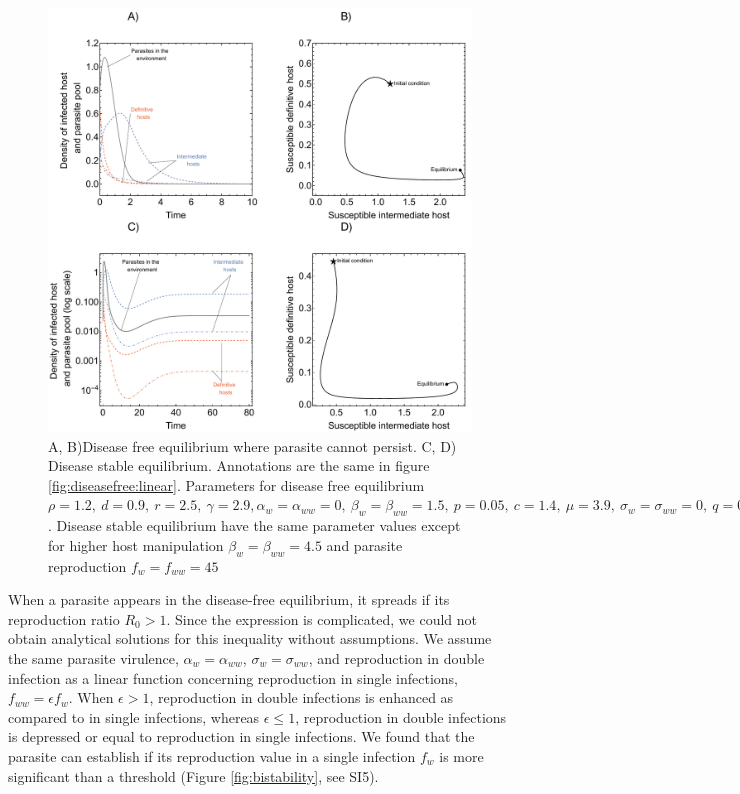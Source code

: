 \documentclass[a4paper]{scrartcl}
\begin{document}
\begin{figure}[!ht]
\includegraphics[width=\textwidth]{Figures/ecotraject_nonlinear.pdf}
\caption{A, B)Disease free equilibrium where parasite cannot persist. C, D) Disease stable equilibrium. Annotations are the same in figure \ref{fig:diseasefree:linear}. Parameters for disease free equilibrium $\rho =  1.2, \ d = 0.9, \  r = 2.5, \ \gamma =  2.9, \alpha_w = \alpha_{ww} =  0, \ \beta_w = \beta_{ww} = 1.5, \ p = 0.05, \  c = 1.4, \ \mu = 3.9, \ \sigma_w = \sigma_{ww} = 0, \ q = 0.05, \ f_w = f_{ww} = 7.5, \ \delta = 0.9, \ k = 0.26, \ h_1 = h_2 = 0.8$. Disease stable equilibrium have the same parameter values except for higher host manipulation $ \beta_w =  \beta_{ww} = 4.5$ and parasite reproduction $ f_w  = f_{ww} = 45$}
\label{fig:ecotraject:nonlinear}
\end{figure}

When a parasite appears in the disease-free equilibrium, it spreads if its reproduction ratio $R_0 > 1$. 
Since the expression is complicated, we could not obtain analytical solutions for this inequality without assumptions. 
We assume the same parasite virulence, $\alpha_w = \alpha_{ww}$, $\sigma_w = \sigma_{ww}$, and reproduction in double infection as a linear function concerning reproduction in single infections, $f_{ww} = \epsilon f_w$. 
When $\epsilon > 1$, reproduction in double infections is enhanced as compared to in single infections, whereas $\epsilon \leq 1$, reproduction in double infections is depressed or equal to reproduction in single infections.
We found that the parasite can establish if its reproduction value in a single infection $f_w$ is more significant than a threshold (Figure \ref{fig:bistability}, see SI5). 
\end{document}
